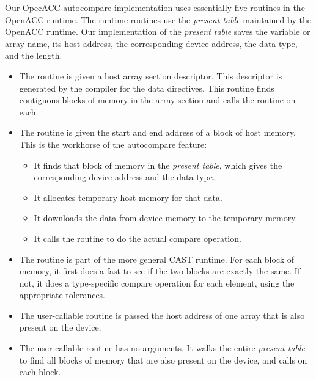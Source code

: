 Our OpecACC autocompare implementation uses essentially five routines in the OpenACC runtime.
The runtime routines use the \emph{present table}\cite{wolfe.ashes.17} maintained by the OpenACC runtime.
Our implementation of the \emph{present table} saves the variable or array name, its host address, the corresponding device address, the data type, and the length.
\begin{itemize}
\item The  routine is given a host array section descriptor.
This descriptor is generated by the compiler for the data directives.
This routine finds contiguous blocks of memory in the array section and calls the  routine on each.
\item The  routine is given the start and end address of a block of host memory.
This is the workhorse of the autocompare feature:
\begin{itemize}
\item It finds that block of memory in the \emph{present table}, which gives the corresponding device address and the data type.
\item It allocates temporary host memory for that data.
\item It downloads the data from device memory to the temporary memory.
\item It calls the  routine to do the actual compare operation.
\end{itemize}
\item The  routine is part of the more general CAST runtime.
For each block of memory, it first does a fast  to see if the two blocks are exactly the same.
If not, it does a type-specific compare operation for each element, using the appropriate tolerances.

\item The user-callable  routine is passed the host address of one array that is also present on the device.
\item The user-callable  routine has no arguments.
It walks the entire \emph{present table} to find all blocks of memory that are also present on the device, and calls  on each block.
\end{itemize}

